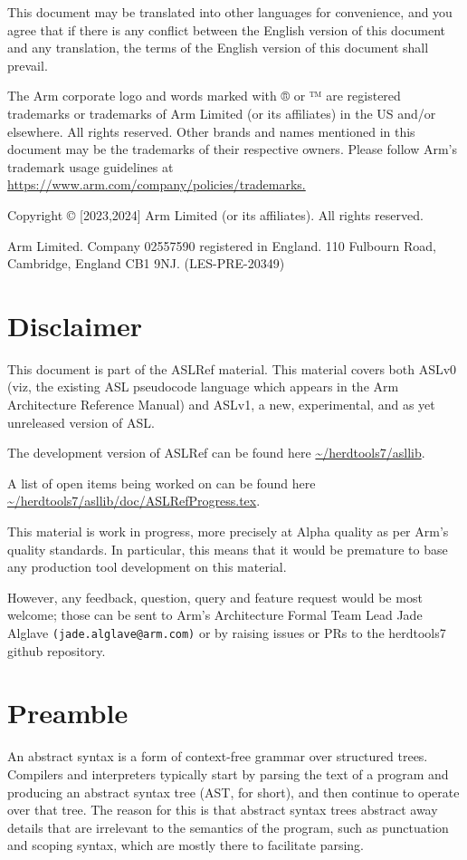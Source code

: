 \documentclass{book}
\begin{document}
This document may be translated into other languages for convenience, and you
agree that if there is any conflict between the English version of this
document and any translation, the terms of the English version of this document
shall prevail.
 
The Arm corporate logo and words marked with ® or ™ are registered trademarks
or trademarks of Arm Limited (or its affiliates) in the US and/or elsewhere.
All rights reserved.  Other brands and names mentioned in this document may be
the trademarks of their respective owners. Please follow Arm’s trademark usage
guidelines at \url{https://www.arm.com/company/policies/trademarks.} 
 
Copyright © [2023,2024] Arm Limited (or its affiliates). All rights reserved. 
 
Arm Limited. Company 02557590 registered in England.  110 Fulbourn Road,
Cambridge, England CB1 9NJ.  (LES-PRE-20349)

\chapter{Disclaimer}

This document is part of the ASLRef material. This material covers both ASLv0
(viz, the existing ASL pseudocode language which appears in the Arm
Architecture Reference Manual) and ASLv1, a new, experimental, and as yet
unreleased version of ASL.

The development version of ASLRef can be found here \url{~/herdtools7/asllib}.

A list of open items being worked on can be found here
\url{~/herdtools7/asllib/doc/ASLRefProgress.tex}.

This material is work in progress, more precisely at Alpha quality as
per Arm’s quality standards. In particular, this means that it would be
premature to base any production tool development on this material.

However, any feedback, question, query and feature request would be most
welcome; those can be sent to Arm’s Architecture Formal Team Lead Jade Alglave
\texttt{(jade.alglave@arm.com)} or by raising issues or PRs to the herdtools7
github repository.

\chapter{Preamble}
An abstract syntax is a form of context-free grammar over structured trees. Compilers and interpreters typically start by parsing the text of a program and producing an abstract syntax tree (AST, for short), and then continue to operate over that tree.
%
The reason for this is that abstract syntax trees abstract away details that are irrelevant to the semantics of the program, such as punctuation and scoping syntax, which are mostly there to facilitate parsing.
\end{document}
